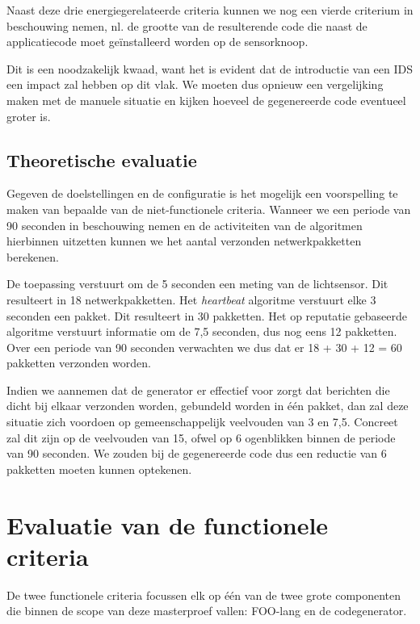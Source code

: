 Naast deze drie energiegerelateerde criteria kunnen we nog een vierde criterium
in beschouwing nemen, nl. de grootte van de resulterende code die naast de
applicatiecode moet ge\"installeerd worden op de sensorknoop.

Dit is een noodzakelijk kwaad, want het is evident dat de introductie van een
IDS een impact zal hebben op dit vlak. We moeten dus opnieuw een vergelijking
maken met de manuele situatie en kijken hoeveel de gegenereerde code eventueel
groter is.

\vspace{-3mm}

\subsection{Theoretische evaluatie}

Gegeven de doelstellingen en de configuratie is het mogelijk een voorspelling
te maken van bepaalde van de niet-functionele criteria. Wanneer we een periode
van 90 seconden in beschouwing nemen en de activiteiten van de algoritmen
hierbinnen uitzetten kunnen we het aantal verzonden netwerkpakketten berekenen.

De toepassing verstuurt om de 5 seconden een meting van de lichtsensor. Dit
resulteert in 18 netwerkpakketten. Het \emph{heartbeat} algoritme verstuurt
elke 3 seconden een pakket. Dit resulteert in 30 pakketten. Het op reputatie
gebaseerde algoritme verstuurt informatie om de 7,5 seconden, dus nog eens 12
pakketten. Over een periode van 90 seconden verwachten we dus dat er 18 + 30 +
12 = 60 pakketten verzonden worden.

Indien we aannemen dat de generator er effectief voor zorgt dat berichten die
dicht bij elkaar verzonden worden, gebundeld worden in \'e\'en pakket, dan zal
deze situatie zich voordoen op gemeenschappelijk veelvouden van 3 en 7,5.
Concreet zal dit zijn op de veelvouden van 15, ofwel op 6 ogenblikken binnen de
periode van 90 seconden. We zouden bij de gegenereerde code dus een reductie
van 6 pakketten moeten kunnen optekenen.

\vspace{-3mm}

\section{Evaluatie van de functionele criteria}
\label{section:evaluation-functionals}

De twee functionele criteria focussen elk op \'e\'en van de twee grote
componenten die binnen de scope van deze masterproef vallen: FOO-lang en de
codegenerator.

